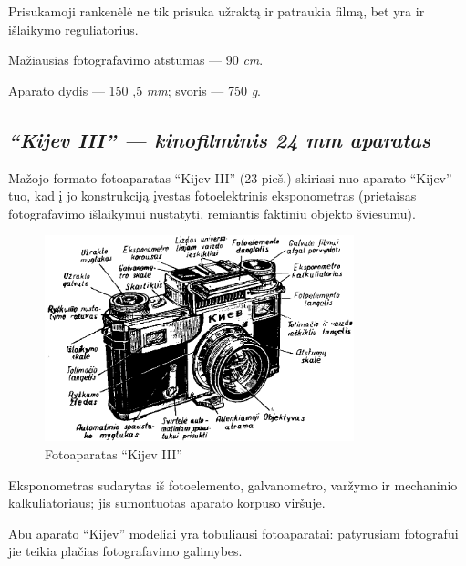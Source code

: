 \documentclass[12pt]{book}
\begin{document}
			Prisukamoji rankenėlė ne tik prisuka užraktą ir patraukia filmą, bet yra ir išlaikymo reguliatorius.

			Mažiausias fotografavimo atstumas --- 90 \textit{cm}.

			Aparato dydis --- 150 ,5  \textit{mm}; svoris --- 750 \textit{g}.
		\subsection*{\textit{``Kijev III'' --- kinofilminis 24  mm aparatas}}
			Mažojo formato fotoaparatas ``Kijev III'' (23 pieš.) skiriasi nuo aparato ``Kijev'' tuo, kad į jo konstrukciją įvestas fotoelektrinis eksponometras (prietaisas fotografavimo išlaikymui nustatyti, remiantis faktiniu objekto šviesumu).
			\begin{figure}[h]
				\centering
				\includegraphics[width=0.8\textwidth]{23-pav}
				\caption{Fotoaparatas ``Kijev III''}
				\label{fig:23}
			\end{figure}
			Eksponometras sudarytas iš fotoelemento, galvanometro, varžymo ir mechaninio kalkuliatoriaus; jis sumontuotas aparato korpuso viršuje.

			Abu aparato ``Kijev'' modeliai yra tobuliausi fotoaparatai: patyrusiam fotografui jie teikia plačias fotografavimo galimybes.
\end{document}
